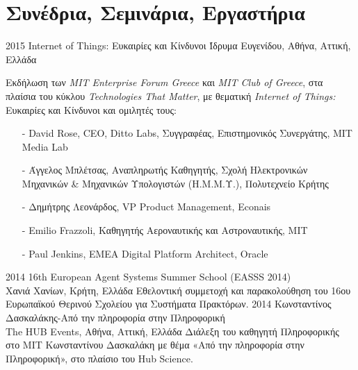 \documentclass[print]{keros-cv} %
\begin{document}
\section{Συνέδρια, Σεμινάρια, Εργαστήρια}
\begin{entrylist}
\entry
{2015}
{Internet of Things: Ευκαιρίες και Κίνδυνοι}
{Ίδρυμα Ευγενίδου, Αθήνα, Αττική, Ελλάδα}
{Εκδήλωση των \emph{MIT Enterprise Forum Greece} και \emph{MIT Club of Greece}, στα πλαίσια του κύκλου \emph{Technologies That Matter}, με θεματική \emph{Internet of Things:} Ευκαιρίες και Κίνδυνοι και ομιλητές τους:
\begin{itemize}
\item[-] David Rose, CEO, Ditto Labs, Συγγραφέας, Επιστημονικός Συνεργάτης, MIT Media Lab
\item[-] Άγγελος Μπλέτσας, Αναπληρωτής Καθηγητής, Σχολή Ηλεκτρονικών Μηχανικών \& Μηχανικών Υπολογιστών (Η.Μ.Μ.Υ.), Πολυτεχνείο Κρήτης
\item[-] Δημήτρης Λεονάρδος, VP Product Management, Econais
\item[-] Emilio Frazzoli, Καθηγητής Αεροναυτικής και Αστροναυτικής, MIT
\item[-] Paul Jenkins, EMEA Digital Platform Architect, Oracle
\end{itemize}
}
\entry
{2014}
{16th European Agent Systems Summer School (EASSS 2014)\\}
{Χανιά Χανίων, Κρήτη, Ελλάδα}
{Εθελοντική συμμετοχή και παρακολούθηση του 16ου Ευρωπαϊκού Θερινού Σχολείου για Συστήματα Πρακτόρων.}
\entry
{2014}
{Κωνσταντίνος Δασκαλάκης-Από την πληροφορία στην Πληροφορική\\}
{The HUB Events, Αθήνα, Αττική, Ελλάδα}
{Διάλεξη του καθηγητή Πληροφορικής στο MIT Κωνσταντίνου Δασκαλάκη με θέμα «Από την πληροφορία στην Πληροφορική», στο πλαίσιο του Hub Science.}
\end{entrylist}

\newpage
\end{document}
